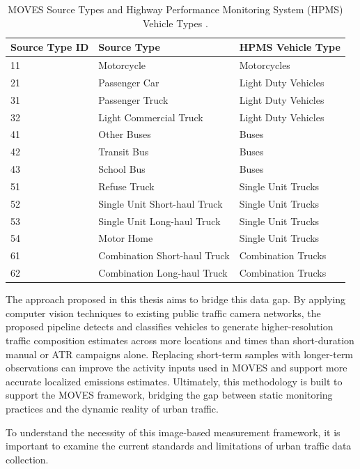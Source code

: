 \begin{table}[!htbp]
    \centering
    \caption{MOVES Source Types and Highway Performance Monitoring System (HPMS) Vehicle Types \cite{USEPA_tech_2024}.}
    \label{tab:moves-hpms}
    \begin{tabular}{l l l}
        \toprule
        Source Type ID & Source Type & HPMS Vehicle Type \\
        \midrule
        11 & Motorcycle & Motorcycles \\
        21 & Passenger Car & Light Duty Vehicles \\
        31 & Passenger Truck & Light Duty Vehicles \\
        32 & Light Commercial Truck & Light Duty Vehicles \\
        41 & Other Buses & Buses \\
        42 & Transit Bus & Buses \\
        43 & School Bus & Buses \\
        51 & Refuse Truck & Single Unit Trucks \\
        52 & Single Unit Short-haul Truck & Single Unit Trucks \\
        53 & Single Unit Long-haul Truck & Single Unit Trucks \\
        54 & Motor Home & Single Unit Trucks \\
        61 & Combination Short-haul Truck & Combination Trucks \\
        62 & Combination Long-haul Truck & Combination Trucks \\
        \bottomrule
    \end{tabular}
\end{table}

The approach proposed in this thesis aims to bridge this data gap. By applying 
computer vision techniques to existing public traffic camera networks, the proposed
pipeline detects and classifies vehicles to generate higher-resolution traffic composition
estimates across more locations and times than short-duration manual or ATR campaigns alone.
Replacing short-term samples with longer-term observations can improve the activity 
inputs used in MOVES and support more accurate localized emissions estimates.
Ultimately, this methodology is built to support the MOVES framework, bridging 
the gap between static monitoring practices and the dynamic reality of urban traffic.

To understand the necessity of this image-based measurement framework, it is 
important to examine the current standards and limitations of urban traffic data collection.

